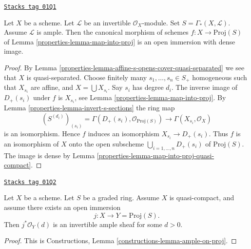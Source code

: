 \begin{lemma}
\label{properties-lemma-ample-immersion-into-proj}
\href{https://stacks.math.columbia.edu/tag/01Q1}{\texttt{Stacks tag 01Q1}}

Let $X$ be a scheme. Let $\mathcal{L}$ be an invertible $\mathcal{O}_X$-module.
Set $S = \Gamma_*(X, \mathcal{L})$.
Assume $\mathcal{L}$ is ample. Then the canonical morphism of schemes
$f : X \longrightarrow \text{Proj}(S)$ of Lemma \ref{properties-lemma-map-into-proj}
is an open immersion with dense image.
\end{lemma}

\begin{proof}

By Lemma \ref{properties-lemma-affine-s-opens-cover-quasi-separated} we see
that $X$ is quasi-separated. Choose finitely many
$s_1, \ldots, s_n \in S_{+}$ homogeneous
such that $X_{s_i}$ are affine, and $X = \bigcup X_{s_i}$.
Say $s_i$ has degree $d_i$. The inverse image of
$D_{+}(s_i)$ under $f$ is $X_{s_i}$, see Lemma \ref{properties-lemma-map-into-proj}.
By Lemma \ref{properties-lemma-invert-s-sections} the ring map
$$
(S^{(d_i)})_{(s_i)} = \Gamma(D_{+}(s_i), \mathcal{O}_{\text{Proj}(S)})
\longrightarrow
\Gamma(X_{s_i}, \mathcal{O}_X)
$$
is an isomorphism. Hence $f$ induces an isomorphism
$X_{s_i} \to D_{+}(s_i)$. Thus $f$ is an isomorphism of $X$ onto the open
subscheme $\bigcup_{i = 1, \ldots, n} D_{+}(s_i)$ of $\text{Proj}(S)$.
The image is dense by Lemma \ref{properties-lemma-map-into-proj-quasi-compact}.
\end{proof}

\begin{lemma}
\label{properties-lemma-open-in-proj-ample}
\href{https://stacks.math.columbia.edu/tag/01Q2}{\texttt{Stacks tag 01Q2}}

Let $X$ be a scheme.
Let $S$ be a graded ring. Assume $X$ is quasi-compact,
and assume there exists an open immersion
$$
j : X \longrightarrow Y = \text{Proj}(S).
$$
Then $j^*\mathcal{O}_Y(d)$ is an invertible ample sheaf
for some $d > 0$.
\end{lemma}

\begin{proof}
This is Constructions, Lemma \ref{constructions-lemma-ample-on-proj}.
\end{proof}

